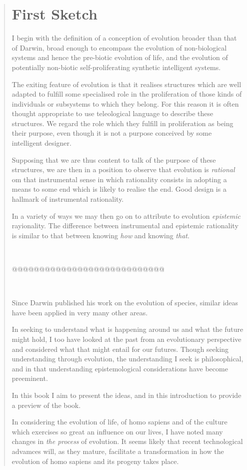 {\begin{quote}
\section{First Sketch}
I begin with the definition of a conception of evolution broader than that of Darwin, broad enough to encompass the evolution of non-biological systems and hence the pre-biotic evolution of life, and the evolution of potentially non-biotic self-proliferating synthetic intelligent systems.

The exiting feature of evolution is that it realises structures which are well adapted to fulfill some specialised role in the proliferation of those kinds of individuals or subsystems to which they belong.
For this reason it is often thought appropriate to use teleological language to describe these structures.
We regard the role which they fulfill in proliferation as being their purpose, even though it is not a purpose conceived by some intelligent designer.

Supposing that we are thus content to talk of the purpose of these structures, we are then in a position to observe that evolution is \emph{rational} om that instrumental sense in which rationality consists in adopting a means to some end which is likely to realise the end.
Good design is a hallmark of instrumental rationality.

In a variety of ways we may then go on to attribute to evolution \emph{epistemic} rayionality.
The difference between instrumental and epistemic rationality is similar to that between knowing \emph{how} and knowing \emph{that}.



\ 

@@@@@@@@@@@@@@@@@@@@@@@@@@@@

\

Since Darwin published his work on the evolution of species, similar ideas have been applied in very many other areas.

In seeking to understand what is happening around us and what the future might hold, I too have looked at the past from an evolutionary perspective and considered what that might entail for our futures.
Though seeking understanding through evolution, the understanding I seek is philosophical, and in that understanding epistemological considerations have become preeminent.

In this book I aim to present the ideas, and in this introduction to provide a preview of the book.

In considering the evolution of life, of homo sapiens and of the culture which exercises so great an influence on our lives, I have noted many changes in \emph{the process} of evolution.
It seems likely that recent technological advamces will, as they mature, facilitate a transformation in how the evolution of homo sapiens and its progeny takes place.


\end{quote}}
